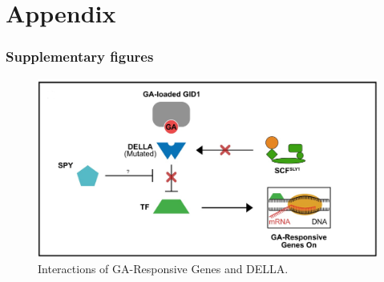 \documentclass[10pt,a4paper]{article}
\begin{document}
\newpage
\appendix
\setcounter{figure}{0}  
\part*{Appendix}

\section{Supplementary figures}

\begin{figure}[H]
	\centering
	\includegraphics[width=0.7\linewidth]{img/ATH2}
	\caption{Interactions of GA-Responsive Genes and DELLA.}
	\label{fig:dellainteractions}
\end{figure}
\end{document}
